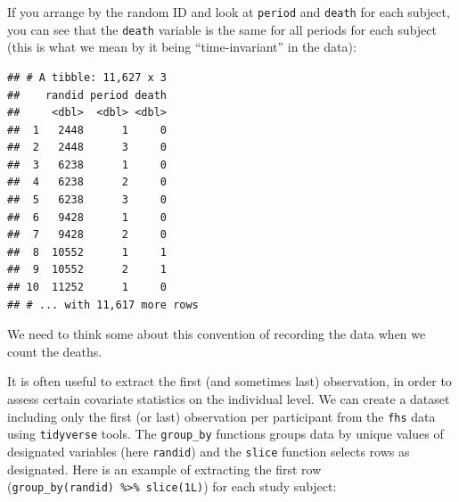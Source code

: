 \documentclass[
]{book}
\newenvironment{Shaded}{\begin{snugshade}}{\end{snugshade}}
\newcommand{\CommentTok}[1]{\textcolor[rgb]{0.56,0.35,0.01}{\textit{#1}}}
\newcommand{\KeywordTok}[1]{\textcolor[rgb]{0.13,0.29,0.53}{\textbf{#1}}}
\newcommand{\NormalTok}[1]{#1}
\newcommand{\OperatorTok}[1]{\textcolor[rgb]{0.81,0.36,0.00}{\textbf{#1}}}
\newcommand{\StringTok}[1]{\textcolor[rgb]{0.31,0.60,0.02}{#1}}
\begin{document}
If you arrange by the random ID and look at \texttt{period} and \texttt{death} for each subject,
you can see that the \texttt{death} variable is the same for all periods for each
subject (this is what we mean by it being ``time-invariant'' in the data):

\begin{Shaded}
\end{Shaded}

\begin{verbatim}
## # A tibble: 11,627 x 3
##    randid period death
##     <dbl>  <dbl> <dbl>
##  1   2448      1     0
##  2   2448      3     0
##  3   6238      1     0
##  4   6238      2     0
##  5   6238      3     0
##  6   9428      1     0
##  7   9428      2     0
##  8  10552      1     1
##  9  10552      2     1
## 10  11252      1     0
## # ... with 11,617 more rows
\end{verbatim}

We need to think some about this convention of recording the data when we count
the deaths.

It is often useful to extract the first (and sometimes last) observation, in order to assess certain covariate statistics on the individual level. We can create a dataset including only the first (or last) observation per participant from the \texttt{fhs} data using \texttt{tidyverse} tools. The \texttt{group\_by} functions groups data by unique values of designated variables (here \texttt{randid}) and the \texttt{slice} function selects rows as designated. Here is an example of extracting the first row (\texttt{group\_by(randid)\ \%\textgreater{}\%\ slice(1L)}) for each study subject:

\begin{Shaded}
\end{Shaded}
\end{document}
